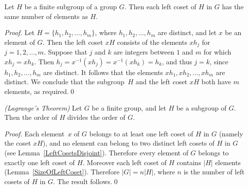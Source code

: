 \begin{lemma}
\label{SizeOfLeftCoset}
Let $H$ be a finite subgroup of a group $G$.  Then each left
coset of $H$ in $G$ has the same number of elements as $H$.
\end{lemma}

\begin{proof}
Let $H = \{ h_1, h_2,\ldots, h_m\}$, where
$h_1, h_2,\ldots, h_m$ are distinct, and let $x$ be an
element of $G$.  Then the left coset $xH$ consists of
the elements $x h_j$ for $j = 1,2,\ldots,m$.
Suppose that $j$ and $k$ are integers between
$1$ and $m$ for which $x h_j = x h_k$.  Then
$h_j = x^{-1} (x h_j) = x^{-1} (x h_k) = h_k$,
and thus $j = k$, since $h_1, h_2,\ldots, h_m$
are distinct.  It follows that the elements
$x h_1, x h_2,\ldots, x h_m$ are distinct.
We conclude that the subgroup~$H$ and the left
coset $xH$ both have $m$ elements,
as required.\qed
\end{proof}

\begin{theorem}
\emph{(Lagrange's Theorem)}
\label{Lagrange}
Let $G$ be a finite group, and let $H$ be a subgroup
of $G$.  Then the order of $H$ divides the order of $G$.
\end{theorem}

\begin{proof}
Each element~$x$ of $G$ belongs to at least one left coset
of $H$ in $G$ (namely the coset $xH$), and no element
can belong to two distinct left cosets of $H$ in $G$
(see Lemma~\ref{LeftCosetsDisjoint}).  Therefore every
element of $G$ belongs to exactly one left coset of $H$.
Moreover each left coset of $H$ contains $|H|$ elements
(Lemma~\ref{SizeOfLeftCoset}).  Therefore $|G| = n |H|$,
where $n$ is the number of left cosets of $H$ in $G$.
The result follows.\qed
\end{proof}